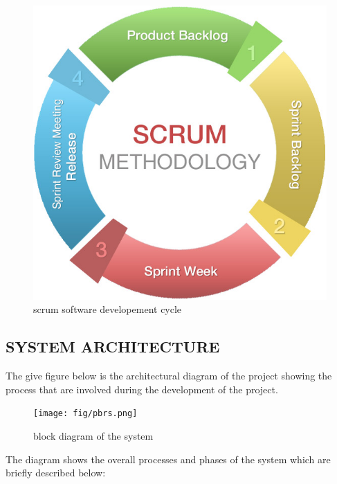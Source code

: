 \begin{figure}[!h]
\centering
\includegraphics[width = 5 cm]{fig/scrum-chart.jpg}
\caption{scrum software developement cycle}
\label{fig:scrum}
\end{figure}

\subsection{SYSTEM ARCHITECTURE}
The give figure below is the architectural diagram of the project showing the process that are involved during the development of the project.

\begin{figure}[!h]
\centering
\texttt{[image: fig/pbrs.png]}
\caption{block diagram of the system}
\label{fig:project}
\end{figure}

The diagram shows the overall processes and phases of the system which are briefly described below:



